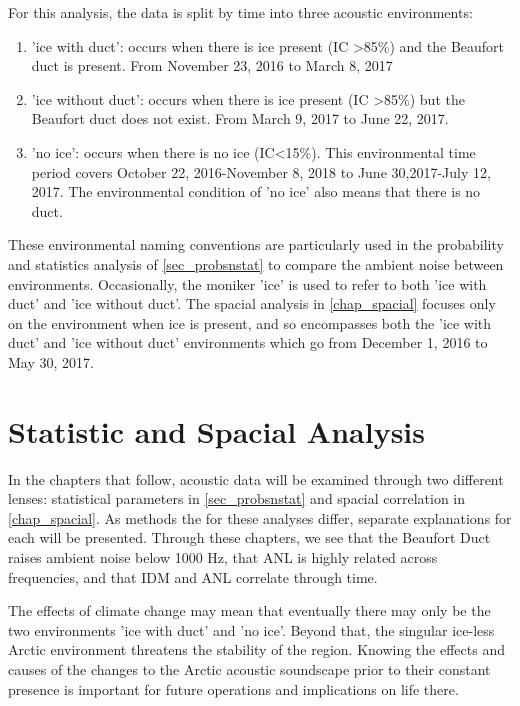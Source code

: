 For this analysis, the data is split by time into three acoustic environments:
\begin{enumerate}
    \item{'ice with duct': occurs when there is ice present (IC >85\%) and the Beaufort duct is present. From November 23, 2016 to March 8, 2017}
    \item{'ice without duct': occurs when there is ice present  (IC >85\%) but the Beaufort duct does not exist. From March 9, 2017 to June 22, 2017.    }
    \item{'no ice': occurs when there is no ice (IC<15\%). This environmental time period covers October 22, 2016-November 8, 2018 to June 30,2017-July 12, 2017. The environmental condition of 'no ice' also means that there is no duct.}
\end{enumerate}

These environmental naming conventions are particularly used in the probability and statistics analysis of \autoref{sec_probsnstat} to compare the ambient noise between environments. Occasionally, the moniker 'ice' is used to refer to both 'ice with duct' and 'ice without duct'. The spacial analysis in \autoref{chap_spacial} focuses only on the environment when ice is present, and so encompasses both the 'ice with duct' and 'ice without duct' environments which go from December 1, 2016 to May 30, 2017. 


\section{Statistic and Spacial Analysis}

In the chapters that follow, acoustic data will be examined through two different lenses: statistical parameters in \autoref{sec_probsnstat} and spacial correlation in \autoref{chap_spacial}. As methods the for these analyses differ, separate explanations for each will be presented. Through these chapters, we see that the Beaufort Duct raises ambient noise below 1000 Hz, that ANL is highly related across frequencies, and that IDM and ANL correlate through time.

The effects of climate change may mean that eventually there may only be the two environments 'ice with duct' and 'no ice'. Beyond that, the singular ice-less Arctic environment threatens the stability of the region. Knowing the effects and causes of the changes to the Arctic acoustic soundscape prior to their constant presence is important for future operations and implications on life there. 


